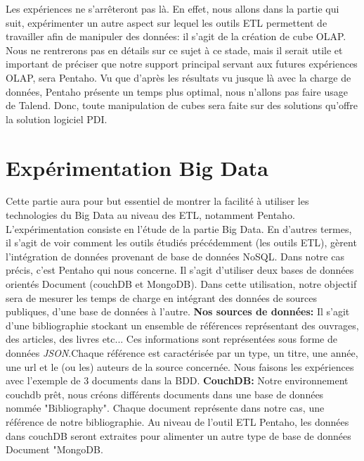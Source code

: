 \documentclass[12pt,a4wide,twoside]{report}
\begin{document}
Les expériences ne s'arrêteront pas là. En effet, nous allons dans la partie qui suit, expérimenter un autre aspect sur lequel les outils ETL permettent de travailler afin de manipuler des données: il s'agit de la création de cube OLAP. Nous ne rentrerons pas en détails sur ce sujet à ce stade, mais il serait utile et important de préciser que notre support principal servant aux futures expériences OLAP, sera Pentaho. Vu que d'après les résultats vu jusque là avec la charge de données, Pentaho présente un temps plus optimal, nous n'allons pas faire usage de Talend. Donc, toute manipulation de cubes sera faite sur des solutions qu'offre la solution logiciel PDI.

\section{Expérimentation Big Data}
Cette partie aura pour but essentiel de montrer la facilité à utiliser les technologies du Big Data au niveau des ETL, notamment Pentaho.\newline
L'expérimentation consiste en l'étude de la partie Big Data. En d'autres termes, il s'agit de voir comment les outils étudiés précédemment (les outils ETL), gèrent l'intégration de données provenant de base de données NoSQL. Dans notre cas précis, c'est Pentaho qui nous concerne.\newline
Il s'agit d'utiliser deux bases de données orientés Document (couchDB et MongoDB). Dans cette utilisation, notre objectif sera de mesurer les temps de charge en intégrant des données de sources publiques, d'une base de données à l'autre.\newline
\textbf{Nos sources de données:}\newline
Il s'agit d'une bibliographie stockant un ensemble de références représentant des ouvrages, des articles, des livres etc... Ces informations sont représentées sous forme de données \emph{JSON}.\newline Chaque référence est caractérisée par un type, un titre, une année, une url et le (ou les) auteurs de la source concernée. Nous faisons les expériences avec l'exemple de 3 documents dans la BDD.\newline
\textbf{CouchDB:}\newline
Notre environnement couchdb prêt, nous créons différents documents dans une base de données nommée "Bibliography". Chaque document représente dans notre cas, une référence de notre bibliographie.\newline
Au niveau de l'outil ETL Pentaho, les données dans couchDB seront extraites pour alimenter un autre type de base de données Document "MongoDB.\newline
\end{document}
